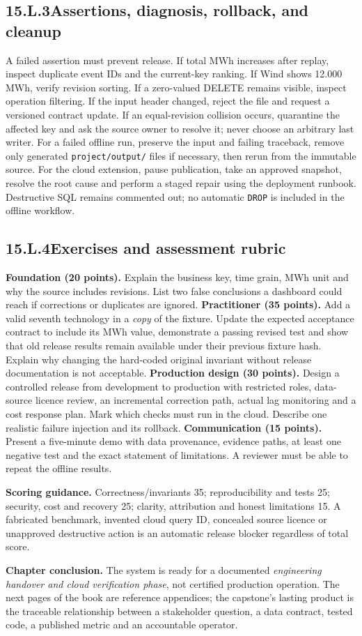 \documentclass[11pt,twoside]{article}
\newcommand{\topic}[2]{\subsection*{#1\quad #2}}
\begin{document}
\newpage

\topic{15.L.3}{Assertions, diagnosis, rollback, and cleanup}
A failed assertion must prevent release. If total MWh increases after replay, inspect duplicate event IDs and the current-key ranking. If Wind shows 12.000 MWh, verify revision sorting. If a zero-valued DELETE remains visible, inspect operation filtering. If the input header changed, reject the file and request a versioned contract update. If an equal-revision collision occurs, quarantine the affected key and ask the source owner to resolve it; never choose an arbitrary last writer.
For a failed offline run, preserve the input and failing traceback, remove only generated \texttt{project/output/} files if necessary, then rerun from the immutable source. For the cloud extension, pause publication, take an approved snapshot, resolve the root cause and perform a staged repair using the deployment runbook. Destructive SQL remains commented out; no automatic \texttt{DROP} is included in the offline workflow.
\topic{15.L.4}{Exercises and assessment rubric}
\textbf{Foundation (20 points).} Explain the business key, time grain, MWh unit and why the source includes revisions. List two false conclusions a dashboard could reach if corrections or duplicates are ignored.
\textbf{Practitioner (35 points).} Add a valid seventh technology in a \emph{copy} of the fixture. Update the expected acceptance contract to include its MWh value, demonstrate a passing revised test and show that old release results remain available under their previous fixture hash. Explain why changing the hard-coded original invariant without release documentation is not acceptable.
\textbf{Production design (30 points).} Design a controlled release from development to production with restricted roles, data-source licence review, an incremental correction path, actual lag monitoring and a cost response plan. Mark which checks must run in the cloud. Describe one realistic failure injection and its rollback.
\textbf{Communication (15 points).} Present a five-minute demo with data provenance, evidence paths, at least one negative test and the exact statement of limitations. A reviewer must be able to repeat the offline results.
\begin{whitebox}\textbf{Scoring guidance.} Correctness/invariants 35; reproducibility and tests 25; security, cost and recovery 25; clarity, attribution and honest limitations 15. A fabricated benchmark, invented cloud query ID, concealed source licence or unapproved destructive action is an automatic release blocker regardless of total score.\end{whitebox}
\textbf{Chapter conclusion.} The system is ready for a documented \emph{engineering handover and cloud verification phase}, not certified production operation. The next pages of the book are reference appendices; the capstone's lasting product is the traceable relationship between a stakeholder question, a data contract, tested code, a published metric and an accountable operator.
\end{document}
